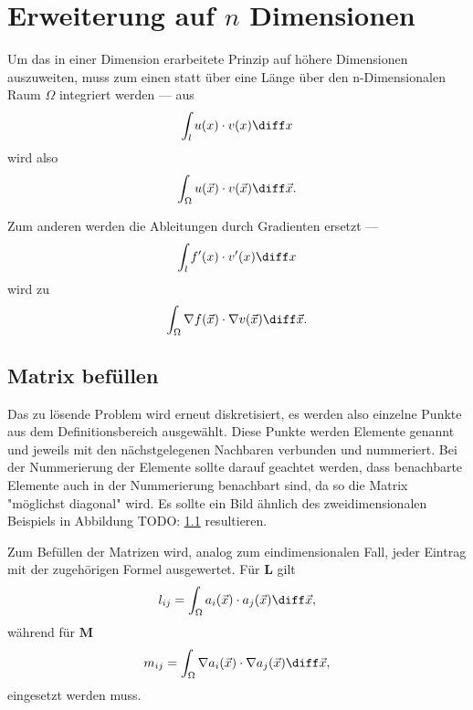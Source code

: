 %
%
%
%
\section{Erweiterung auf $n$ Dimensionen\label{fem:erweiterung_nD}}
Um das in einer Dimension erarbeitete Prinzip auf höhere Dimensionen auszuweiten, muss zum einen statt über eine Länge über den n-Dimensionalen Raum $\Omega$ integriert werden ---
aus 
\begin{equation}
    \int_{l} u(x) \cdot v(x) \diff x
\end{equation}
wird also
\begin{equation}
    \int_{\Omega} u(\vec{x}) \cdot v(\vec{x}) \diff \vec{x}.
\end{equation}

Zum anderen werden die Ableitungen durch Gradienten ersetzt ---
\begin{equation}
    \int_{l} f'(x) \cdot v'(x) \diff x
\end{equation}
wird zu
\begin{equation}
    \int_{\Omega} \nabla f(\vec{x}) \cdot \nabla v(\vec{x}) \diff \vec{x}.
\end{equation}


\subsection{Matrix befüllen}
Das zu lösende Problem wird erneut diskretisiert, es werden also einzelne Punkte aus dem Definitionsbereich ausgewählt.
Diese Punkte werden Elemente genannt und jeweils mit den nächstgelegenen Nachbaren verbunden und nummeriert. 
Bei der Nummerierung der Elemente sollte darauf geachtet werden, dass benachbarte Elemente auch in der Nummerierung benachbart sind, da so die Matrix "möglichst diagonal" wird. %
Es sollte ein Bild ähnlich des zweidimensionalen Beispiels in Abbildung TODO: \ref{} resultieren. %

Zum Befüllen der Matrizen wird, analog zum eindimensionalen Fall, jeder Eintrag mit der zugehörigen Formel ausgewertet.
Für $\mathbf{L}$ gilt
\begin{equation}
    l_{ij} = \int_{\Omega} a_i(\vec{x}) \cdot a_j(\vec{x}) \diff \vec{x},
\end{equation}
während für $\mathbf{M}$ 
\begin{equation}
    m_{ij} = \int_{\Omega} \nabla a_i(\vec{x}) \cdot \nabla a_j(\vec{x}) \diff \vec{x},
\end{equation}
eingesetzt werden muss.

